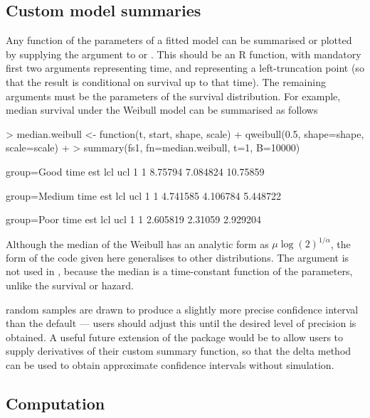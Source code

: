 \documentclass[nojss,nofooter]{jss}
\begin{document}
\subsection{Custom model summaries}

Any function of the parameters of a fitted model can be summarised or plotted by
supplying the argument  to  or
.  This should be an R function, with mandatory
first two arguments  representing time, and 
representing a left-truncation point (so that the result is
conditional on survival up to that time). The remaining arguments must
be the parameters of the survival distribution.  For example, median 
survival under the Weibull model  can be summarised as follows
\begin{Schunk}
\begin{Sinput}
> median.weibull <- function(t, start, shape, scale) { 
+     qweibull(0.5, shape=shape, scale=scale) 
+ }
> summary(fs1, fn=median.weibull, t=1, B=10000)
\end{Sinput}
\begin{Soutput}
group=Good 
  time     est      lcl      ucl
1    1 8.75794 7.084824 10.75859

group=Medium 
  time      est      lcl      ucl
1    1 4.741585 4.106784 5.448722

group=Poor 
  time      est     lcl      ucl
1    1 2.605819 2.31059 2.929204
\end{Soutput}
\end{Schunk}
Although the median of the Weibull has an analytic form as $\mu
\log(2)^{1/\alpha}$, the form of the code given here generalises to
other distributions.
The argument  is not used in , because
the median is a time-constant function of the parameters, unlike the
survival or hazard.

 random samples are drawn to produce
a slightly more precise confidence interval than the default --- users
should adjust this until the desired level of precision is obtained.
A useful future extension of the package would be to allow users to 
supply derivatives of their custom summary function, so that the 
delta method can be used to obtain approximate confidence intervals 
without simulation.


\subsection{Computation}
\end{document}
